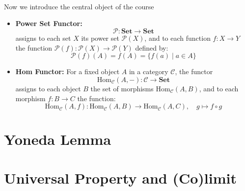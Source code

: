Now we introduce the central object of the course

\begin{itemize}

    \item \textbf{Power Set Functor:}
    \[
    \mathcal{P}: \mathbf{Set} \to \mathbf{Set}
    \]
    assigns to each set $X$ its power set $\mathcal{P}(X)$, and to each function $f: X \to Y$ the function $\mathcal{P}(f): \mathcal{P}(X) \to \mathcal{P}(Y)$ defined by:
    \[
    \mathcal{P}(f)(A) = f(A) = \{ f(a) \mid a \in A \}
    \]

    \item \textbf{Hom Functor:} For a fixed object $A$ in a category $\mathcal{C}$, the functor
    \[
    \mathrm{Hom}_{\mathcal{C}}(A, -): \mathcal{C} \to \mathbf{Set}
    \]
    assigns to each object $B$ the set of morphisms $\mathrm{Hom}_{\mathcal{C}}(A, B)$, and to each morphism $f: B \to C$ the function:
    \[
    \mathrm{Hom}_{\mathcal{C}}(A, f): \mathrm{Hom}_{\mathcal{C}}(A, B) \to \mathrm{Hom}_{\mathcal{C}}(A, C), \quad g \mapsto f \circ g
    \]
\end{itemize}
\section{Yoneda Lemma}

\section{Universal Property and (Co)limit}
